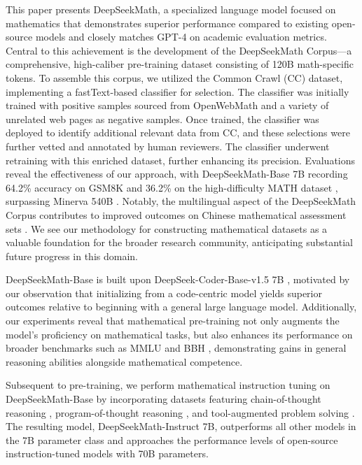This paper presents DeepSeekMath, a specialized language model focused on mathematics that demonstrates superior performance compared to existing open-source models and closely matches GPT-4 on academic evaluation metrics. Central to this achievement is the development of the DeepSeekMath Corpus—a comprehensive, high-caliber pre-training dataset consisting of 120B math-specific tokens. To assemble this corpus, we utilized the Common Crawl (CC) dataset, implementing a fastText-based classifier \citep{joulin2016fasttext} for selection. The classifier was initially trained with positive samples sourced from OpenWebMath \citep{openwebmath} and a variety of unrelated web pages as negative samples. Once trained, the classifier was deployed to identify additional relevant data from CC, and these selections were further vetted and annotated by human reviewers. The classifier underwent retraining with this enriched dataset, further enhancing its precision. Evaluations reveal the effectiveness of our approach, with DeepSeekMath-Base 7B recording 64.2\% accuracy on GSM8K \citep{gsm8k} and 36.2\% on the high-difficulty MATH dataset \citep{MATH}, surpassing Minerva 540B \citep{minerva}. Notably, the multilingual aspect of the DeepSeekMath Corpus contributes to improved outcomes on Chinese mathematical assessment sets \citep{wei2023cmath,agieval}. We see our methodology for constructing mathematical datasets as a valuable foundation for the broader research community, anticipating substantial future progress in this domain.

DeepSeekMath-Base is built upon DeepSeek-Coder-Base-v1.5 7B \citep{deepseek-coder}, motivated by our observation that initializing from a code-centric model yields superior outcomes relative to beginning with a general large language model. Additionally, our experiments reveal that mathematical pre-training not only augments the model's proficiency on mathematical tasks, but also enhances its performance on broader benchmarks such as MMLU \citep{mmlu} and BBH \citep{bbh}, demonstrating gains in general reasoning abilities alongside mathematical competence.

Subsequent to pre-training, we perform mathematical instruction tuning on DeepSeekMath-Base by incorporating datasets featuring chain-of-thought reasoning \citep{cot}, program-of-thought reasoning \citep{pot,pal}, and tool-augmented problem solving \citep{tora}. The resulting model, DeepSeekMath-Instruct 7B, outperforms all other models in the 7B parameter class and approaches the performance levels of open-source instruction-tuned models with 70B parameters.

